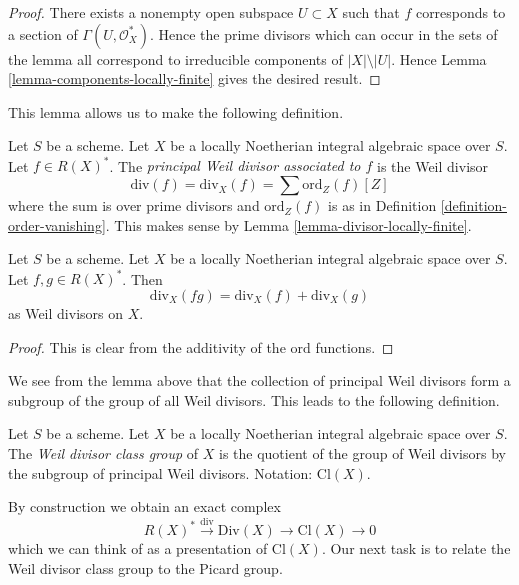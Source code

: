 \begin{proof}
There exists a nonempty open subspace $U \subset X$
such that $f$ corresponds to a section of $\Gamma(U, \mathcal{O}_X^*)$.
Hence the prime divisors which can occur in the sets of the lemma all
correspond to irreducible components of $|X| \setminus |U|$.
Hence Lemma \ref{lemma-components-locally-finite} gives the desired result.
\end{proof}

\noindent
This lemma allows us to make the following definition.

\begin{definition}
\label{definition-principal-divisor}
Let $S$ be a scheme.
Let $X$ be a locally Noetherian integral algebraic space over $S$.
Let $f \in R(X)^*$.
The {\it principal Weil divisor associated to $f$} is the Weil divisor
$$
\text{div}(f) = \text{div}_X(f) = \sum \text{ord}_Z(f) [Z]
$$
where the sum is over prime divisors and $\text{ord}_Z(f)$ is as in
Definition \ref{definition-order-vanishing}. This makes sense
by Lemma \ref{lemma-divisor-locally-finite}.
\end{definition}

\begin{lemma}
\label{lemma-div-additive}
Let $S$ be a scheme.
Let $X$ be a locally Noetherian integral algebraic space over $S$.
Let $f, g \in R(X)^*$. Then
$$
\text{div}_X(fg) = \text{div}_X(f) + \text{div}_X(g)
$$
as Weil divisors on $X$.
\end{lemma}

\begin{proof}
This is clear from the additivity of the $\text{ord}$ functions.
\end{proof}

\noindent
We see from the lemma above that the collection of principal Weil divisors
form a subgroup of the group of all Weil divisors. This leads to the following
definition.

\begin{definition}
\label{definition-class-group}
Let $S$ be a scheme.
Let $X$ be a locally Noetherian integral algebraic space over $S$. The
{\it Weil divisor class group} of $X$ is the quotient of
the group of Weil divisors by the subgroup of principal Weil divisors.
Notation: $\text{Cl}(X)$.
\end{definition}

\noindent
By construction we obtain an exact complex
\begin{equation}
\label{equation-Weil-divisor-class}
R(X)^* \xrightarrow{\text{div}} \text{Div}(X) \to \text{Cl}(X) \to 0
\end{equation}
which we can think of as a presentation of $\text{Cl}(X)$. Our next task
is to relate the Weil divisor class group to the Picard group.

